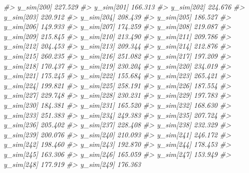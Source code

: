 \documentclass[
  10pt,
  italian,
  a4paper,
  extrafontsizes,onecolumn,openright
  ]{memoir}
\newenvironment{Shaded}{\begin{snugshade}}{\end{snugshade}}
\newcommand{\CommentTok}[1]{\textcolor[rgb]{0.56,0.35,0.01}{\textit{#1}}}
\begin{document}
\begin{Shaded}
\begin{Highlighting}[]
\CommentTok{\#\textgreater{}   y\_sim[200] 227.529}
\CommentTok{\#\textgreater{}   y\_sim[201] 166.313}
\CommentTok{\#\textgreater{}   y\_sim[202] 224.676}
\CommentTok{\#\textgreater{}   y\_sim[203] 220.912}
\CommentTok{\#\textgreater{}   y\_sim[204] 208.439}
\CommentTok{\#\textgreater{}   y\_sim[205] 186.527}
\CommentTok{\#\textgreater{}   y\_sim[206] 149.933}
\CommentTok{\#\textgreater{}   y\_sim[207] 174.259}
\CommentTok{\#\textgreater{}   y\_sim[208] 219.087}
\CommentTok{\#\textgreater{}   y\_sim[209] 215.845}
\CommentTok{\#\textgreater{}   y\_sim[210] 213.490}
\CommentTok{\#\textgreater{}   y\_sim[211] 209.786}
\CommentTok{\#\textgreater{}   y\_sim[212] 204.453}
\CommentTok{\#\textgreater{}   y\_sim[213] 209.344}
\CommentTok{\#\textgreater{}   y\_sim[214] 212.876}
\CommentTok{\#\textgreater{}   y\_sim[215] 260.235}
\CommentTok{\#\textgreater{}   y\_sim[216] 251.082}
\CommentTok{\#\textgreater{}   y\_sim[217] 197.209}
\CommentTok{\#\textgreater{}   y\_sim[218] 170.437}
\CommentTok{\#\textgreater{}   y\_sim[219] 230.204}
\CommentTok{\#\textgreater{}   y\_sim[220] 234.019}
\CommentTok{\#\textgreater{}   y\_sim[221] 175.245}
\CommentTok{\#\textgreater{}   y\_sim[222] 155.684}
\CommentTok{\#\textgreater{}   y\_sim[223] 265.421}
\CommentTok{\#\textgreater{}   y\_sim[224] 199.821}
\CommentTok{\#\textgreater{}   y\_sim[225] 258.191}
\CommentTok{\#\textgreater{}   y\_sim[226] 187.554}
\CommentTok{\#\textgreater{}   y\_sim[227] 229.748}
\CommentTok{\#\textgreater{}   y\_sim[228] 230.231}
\CommentTok{\#\textgreater{}   y\_sim[229] 197.783}
\CommentTok{\#\textgreater{}   y\_sim[230] 184.381}
\CommentTok{\#\textgreater{}   y\_sim[231] 165.520}
\CommentTok{\#\textgreater{}   y\_sim[232] 168.630}
\CommentTok{\#\textgreater{}   y\_sim[233] 251.383}
\CommentTok{\#\textgreater{}   y\_sim[234] 249.383}
\CommentTok{\#\textgreater{}   y\_sim[235] 207.724}
\CommentTok{\#\textgreater{}   y\_sim[236] 205.402}
\CommentTok{\#\textgreater{}   y\_sim[237] 228.408}
\CommentTok{\#\textgreater{}   y\_sim[238] 232.329}
\CommentTok{\#\textgreater{}   y\_sim[239] 200.076}
\CommentTok{\#\textgreater{}   y\_sim[240] 210.093}
\CommentTok{\#\textgreater{}   y\_sim[241] 246.172}
\CommentTok{\#\textgreater{}   y\_sim[242] 198.460}
\CommentTok{\#\textgreater{}   y\_sim[243] 192.870}
\CommentTok{\#\textgreater{}   y\_sim[244] 178.453}
\CommentTok{\#\textgreater{}   y\_sim[245] 163.306}
\CommentTok{\#\textgreater{}   y\_sim[246] 165.059}
\CommentTok{\#\textgreater{}   y\_sim[247] 153.949}
\CommentTok{\#\textgreater{}   y\_sim[248] 177.919}
\CommentTok{\#\textgreater{}   y\_sim[249] 176.363}

\end{Highlighting}
\end{Shaded}
\end{document}
